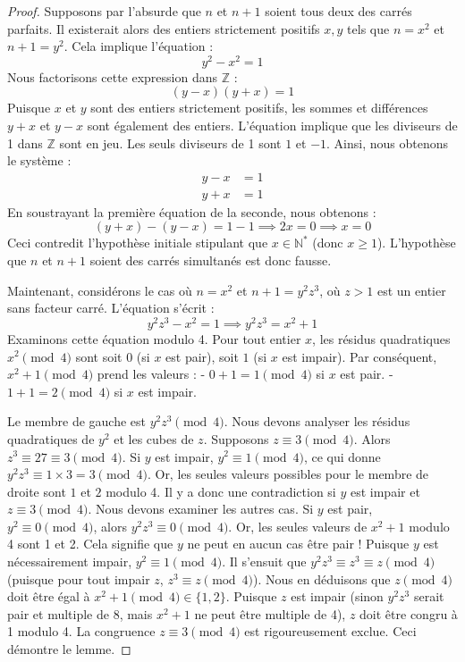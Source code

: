 \documentclass[11pt,a4paper]{article}
\begin{document}
\begin{proof}
Supposons par l'absurde que $n$ et $n+1$ soient tous deux des carrés parfaits.
Il existerait alors des entiers strictement positifs $x, y$ tels que $n = x^2$ et $n+1 = y^2$.
Cela implique l'équation :
\begin{equation}
y^2 - x^2 = 1
\end{equation}
Nous factorisons cette expression dans $\mathbb{Z}$ :
\begin{equation}
(y - x)(y + x) = 1
\end{equation}
Puisque $x$ et $y$ sont des entiers strictement positifs, les sommes et différences $y+x$ et $y-x$ sont également des entiers. L'équation implique que les diviseurs de 1 dans $\mathbb{Z}$ sont en jeu. Les seuls diviseurs de 1 sont $1$ et $-1$. Ainsi, nous obtenons le système :
\begin{align}
y - x &= 1 \\
y + x &= 1
\end{align}
En soustrayant la première équation de la seconde, nous obtenons :
\begin{equation}
(y + x) - (y - x) = 1 - 1 \implies 2x = 0 \implies x = 0
\end{equation}
Ceci contredit l'hypothèse initiale stipulant que $x \in \mathbb{N}^*$ (donc $x \ge 1$). L'hypothèse que $n$ et $n+1$ soient des carrés simultanés est donc fausse.

Maintenant, considérons le cas où $n = x^2$ et $n+1 = y^2 z^3$, où $z > 1$ est un entier sans facteur carré.
L'équation s'écrit :
\begin{equation}
y^2 z^3 - x^2 = 1 \implies y^2 z^3 = x^2 + 1
\end{equation}
Examinons cette équation modulo 4.
Pour tout entier $x$, les résidus quadratiques $x^2 \pmod 4$ sont soit $0$ (si $x$ est pair), soit $1$ (si $x$ est impair).
Par conséquent, $x^2 + 1 \pmod 4$ prend les valeurs :
- $0 + 1 = 1 \pmod 4$ si $x$ est pair.
- $1 + 1 = 2 \pmod 4$ si $x$ est impair.

Le membre de gauche est $y^2 z^3 \pmod 4$. Nous devons analyser les résidus quadratiques de $y^2$ et les cubes de $z$.
Supposons $z \equiv 3 \pmod 4$. Alors $z^3 \equiv 27 \equiv 3 \pmod 4$.
Si $y$ est impair, $y^2 \equiv 1 \pmod 4$, ce qui donne $y^2 z^3 \equiv 1 \times 3 = 3 \pmod 4$.
Or, les seules valeurs possibles pour le membre de droite sont $1$ et $2$ modulo 4.
Il y a donc une contradiction si $y$ est impair et $z \equiv 3 \pmod 4$.
Nous devons examiner les autres cas.
Si $y$ est pair, $y^2 \equiv 0 \pmod 4$, alors $y^2 z^3 \equiv 0 \pmod 4$. Or, les seules valeurs de $x^2+1$ modulo 4 sont 1 et 2. Cela signifie que $y$ ne peut en aucun cas être pair !
Puisque $y$ est nécessairement impair, $y^2 \equiv 1 \pmod 4$.
Il s'ensuit que $y^2 z^3 \equiv z^3 \equiv z \pmod 4$ (puisque pour tout impair $z$, $z^3 \equiv z \pmod 4$).
Nous en déduisons que $z \pmod 4$ doit être égal à $x^2 + 1 \pmod 4 \in \{1, 2\}$.
Puisque $z$ est impair (sinon $y^2 z^3$ serait pair et multiple de 8, mais $x^2+1$ ne peut être multiple de 4), $z$ doit être congru à 1 modulo 4.
La congruence $z \equiv 3 \pmod 4$ est rigoureusement exclue. Ceci démontre le lemme.
\end{proof}
\end{document}
